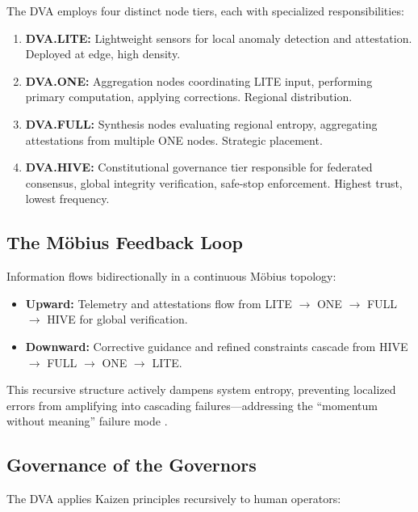 \documentclass[11pt,letterpaper]{article}
\begin{document}
The DVA employs four distinct node tiers, each with specialized responsibilities:

\begin{enumerate}
    \item \textbf{DVA.LITE:} Lightweight sensors for local anomaly detection and attestation. Deployed at edge, high density.
    
    \item \textbf{DVA.ONE:} Aggregation nodes coordinating LITE input, performing primary computation, applying corrections. Regional distribution.
    
    \item \textbf{DVA.FULL:} Synthesis nodes evaluating regional entropy, aggregating attestations from multiple ONE nodes. Strategic placement.
    
    \item \textbf{DVA.HIVE:} Constitutional governance tier responsible for federated consensus, global integrity verification, safe-stop enforcement. Highest trust, lowest frequency.
\end{enumerate}

\subsection{The Möbius Feedback Loop}

Information flows bidirectionally in a continuous Möbius topology:

\begin{itemize}
    \item \textbf{Upward:} Telemetry and attestations flow from LITE $\rightarrow$ ONE $\rightarrow$ FULL $\rightarrow$ HIVE for global verification.
    \item \textbf{Downward:} Corrective guidance and refined constraints cascade from HIVE $\rightarrow$ FULL $\rightarrow$ ONE $\rightarrow$ LITE.
\end{itemize}

This recursive structure actively dampens system entropy, preventing localized errors from amplifying into cascading failures—addressing the ``momentum without meaning'' failure mode \citep{judan2025integrity}.

\subsection{Governance of the Governors}

The DVA applies Kaizen principles recursively to human operators:
\end{document}
